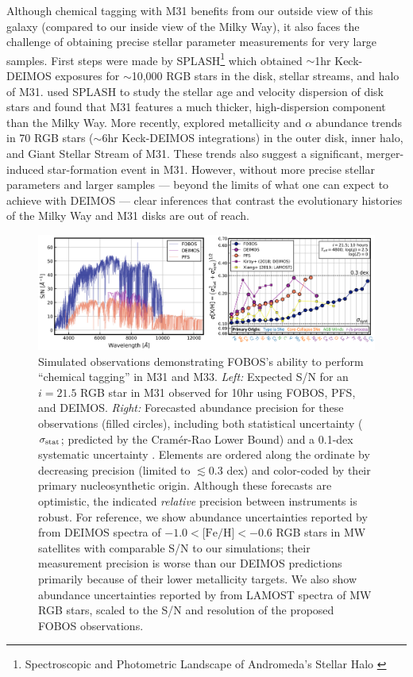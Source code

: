 \documentclass[11pt,a4paper,twoside,onecolumn,openany,final,oldfontcommands]{memoir}
\begin{document}
Although chemical tagging with M31 benefits from our outside view of this galaxy (compared to our inside view of the Milky Way), it also faces the challenge of obtaining precise stellar parameter measurements for very large samples.  First steps were made by SPLASH\footnote{Spectroscopic and Photometric Landscape of Andromeda’s Stellar Halo \citep[e.g.][]{splash}} which obtained $\sim$1hr Keck-DEIMOS exposures for $\sim$10,000 RGB stars in the disk, stellar streams, and halo of M31.  \citet{dorman15} used SPLASH to study the stellar age and velocity dispersion of disk stars and found that M31 features a much thicker, high-dispersion component than the Milky Way.  More recently, \citet{Escala20} explored metallicity and $\alpha$ abundance trends in 70 RGB stars ($\sim$6hr Keck-DEIMOS integrations) in the outer disk, inner halo, and Giant Stellar Stream of M31.  These trends also suggest a significant, merger-induced star-formation event in M31.  However, without more precise stellar parameters and larger samples --- beyond the limits of what one can expect to achieve with DEIMOS --- clear inferences that contrast the evolutionary histories of the Milky Way and M31 disks are out of reach.

\begin{figure}
\includegraphics[width=1.0\textwidth]{figs/abundances_snr_v6.png}
\caption{Simulated observations demonstrating FOBOS's ability to perform ``chemical tagging'' in M31 and M33. \textit{Left:} Expected S/N for an $i=21.5$ RGB star in M31 observed for 10hr using FOBOS, PFS, and DEIMOS. \textit{Right:}  Forecasted abundance precision for these observations (filled circles), including both statistical uncertainty ($\sigma_{\rm stat}$; predicted by the Cram\'er-Rao Lower Bound) and a 0.1-dex systematic uncertainty \citep[$\sigma_{\rm syst}$; cf.,][]{kirby18, Xiang2019}. Elements are ordered along the ordinate by decreasing precision (limited to $\lesssim$0.3 dex) and color-coded by their primary nucleosynthetic origin. Although these forecasts are optimistic, the indicated \textit{relative} precision between instruments is robust. For reference, we show abundance uncertainties reported by \citet[][purple squares]{kirby18} from DEIMOS spectra of $-1.0<\text{[Fe/H]}<-0.6$ RGB stars in MW satellites with comparable S/N to our simulations; their measurement precision is worse than our DEIMOS predictions primarily because of their lower metallicity targets.  We also show abundance uncertainties reported by \citet[][yellow squares]{Xiang2019} from LAMOST spectra of MW RGB stars, scaled to the S/N and resolution of the proposed FOBOS  observations.}
\label{fig:abundances_snr}
\end{figure}
\end{document}
